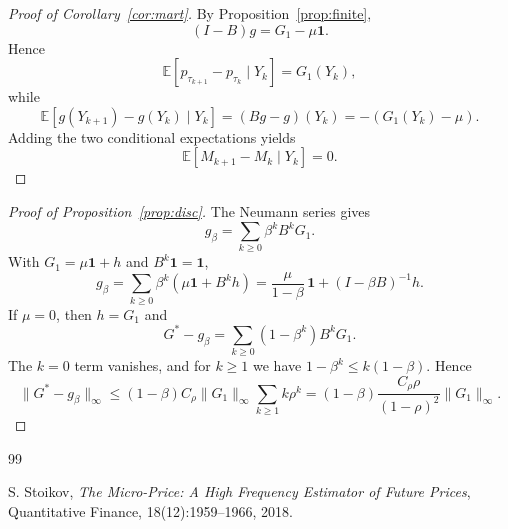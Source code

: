 \documentclass[11pt]{article}
\theoremstyle{plain}
\newcommand{\1}{\mathbf{1}}
\newcommand{\E}{\mathbb{E}}
\newcommand{\norm}[1]{\lVert #1 \rVert}
\begin{document}
\begin{proof}[Proof of Corollary~\ref{cor:mart}]
By Proposition~\ref{prop:finite},
\[
(I-B)g=G_1-\mu\1.
\]
Hence
\[
\E[p_{\tau_{k+1}}-p_{\tau_k}\mid Y_k]=G_1(Y_k),
\]
while
\[
\E[g(Y_{k+1})-g(Y_k)\mid Y_k]=(Bg-g)(Y_k)=-(G_1(Y_k)-\mu).
\]
Adding the two conditional expectations yields
\[
\E[M_{k+1}-M_k\mid Y_k]=0.
\]
\end{proof}

\begin{proof}[Proof of Proposition~\ref{prop:disc}]
The Neumann series gives
\[
g_\beta=\sum_{k\ge 0}\beta^k B^kG_1.
\]
With $G_1=\mu\1+h$ and $B^k\1=\1$,
\[
g_\beta=\sum_{k\ge 0}\beta^k(\mu\1+B^k h)=\frac{\mu}{1-\beta}\,\1+(I-\beta B)^{-1}h.
\]
If $\mu=0$, then $h=G_1$ and
\[
G^*-g_\beta=\sum_{k\ge 0}(1-\beta^k)B^kG_1.
\]
The $k=0$ term vanishes, and for $k\ge 1$ we have $1-\beta^k\le k(1-\beta)$. Hence
\[
\norm{G^*-g_\beta}_\infty
\le
(1-\beta)C_\rho\norm{G_1}_\infty\sum_{k\ge 1}k\rho^k
=
(1-\beta)\frac{C_\rho\rho}{(1-\rho)^2}\norm{G_1}_\infty.
\]
\end{proof}

\begin{thebibliography}{99}

S. Stoikov,
\emph{The Micro-Price: A High Frequency Estimator of Future Prices},
Quantitative Finance, 18(12):1959--1966, 2018.

\end{thebibliography}
\end{document}
